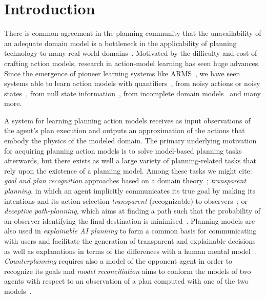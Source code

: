 
\section{Introduction}
\label{sec:introduction}

There is common agreement in the planning community that the unavailability of an adequate domain model is a bottleneck in the applicability of planning technology to many real-world domains~\cite{kambhampati:modellite:AAAI2007}. Motivated by the difficulty and cost of crafting action models, research in action-model learning has seen huge advances. Since the emergence of pioneer learning systems like ARMS~\cite{yang2007learning}, we have seen systems able to learn action models with quantifiers~\cite{AmirC08,ZhuoYHL10}, from noisy actions or noisy states~\cite{zhuo2013action,MouraoZPS12}, from null state information~\cite{cresswell2013acquiring}, from incomplete domain models~\cite{ZhuoNK13,ZhuoK17} and many more.

A system for learning planning action models receives as input observations of the agent's plan execution and \textcolor[rgb]{1.00,0.00,0.00}{outputs an approximation of the actions that embody the physics of the modeled domain.} The primary underlying motivation for acquiring planning action models is to solve model-based planning tasks afterwards, \textcolor[rgb]{1.00,0.00,0.00}{but there exists as well a large variety of planning-related tasks that rely upon the existence of a planning model. Among these tasks we might cite: \emph{goal and plan recognition} approaches based on a domain theory~\cite{ramirez2009plan,ramirez2012plan,SohrabiRU16}; \emph{transparent planning}, in which an agent implicitly communicates its true goal by making its intentions and its action selection {\em transparent} (recognizable) to observers~\cite{MacNallyLRP18}; or \emph{deceptive path-planning}, which aims at finding a path such that the probability of an observer identifying the final destination is minimised~\cite{MastersS17}. Planning models are also used in \emph{explainable AI planning} to form a common basis for communicating with users and facilitate the generation of transparent and explainable decisions~\cite{FoxLM17} as well as explanations in terms of the differences with a human mental model~\cite{ChakrabortiSK18}. \emph{Counterplanning} requires also a model of the opponent agent in order to recognize its goals \cite{PozancoEFB18} and \emph{model reconciliation} aims to conform the models of two agents with respect to an observation of a plan computed with one of the two models~\cite{ChakrabortiSZK17}.}

